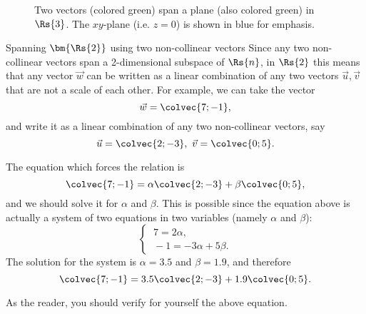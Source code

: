 \begin{figure}
	\centering
	\caption{Two vectors (colored green) span a plane (also colored green) in $\Rs{3}$. The $xy$-plane (i.e. $z=0$) is shown in blue for emphasis.}
	\label{fig:span of two vectors}
\end{figure}

\begin{example}{Spanning $\bm{\Rs{2}}$ using two non-collinear vectors}{}
	Since any two non-collinear vectors span a 2-dimensional subspace of $\Rs{n}$, in $\Rs{2}$ this means that any vector $\vec{w}$ can be written as a linear combination of any two vectors $\vec{u},\vec{v}$ that are not a scale of each other. For example, we can take the vector
	\[
		\vec{w} = \colvec{7;-1},
	\]
	and write it as a linear combination of any two non-collinear vectors, say
	\[
		\vec{u}=\colvec{2;-3},\ \vec{v}=\colvec{0;5}.
	\]

	The equation which forces the relation is
	\[
		\colvec{7;-1} = \alpha\colvec{2;-3} + \beta\colvec{0;5},
	\]
	and we should solve it for $\alpha$ and $\beta$. This is possible since the equation above is actually a system of two equations in two variables (namely $\alpha$ and $\beta$):
	\[
		\begin{cases}
			\ 7  = 2\alpha,\\
			\ -1 = -3\alpha + 5\beta.
		\end{cases}
	\]
	The solution for the system is $\alpha=3.5$ and $\beta=1.9$, and therefore
	\[
		\colvec{7;-1} = 3.5\colvec{2;-3} + 1.9\colvec{0;5}.
	\]
	
	As the reader, you should verify for yourself the above equation.
\end{example}

